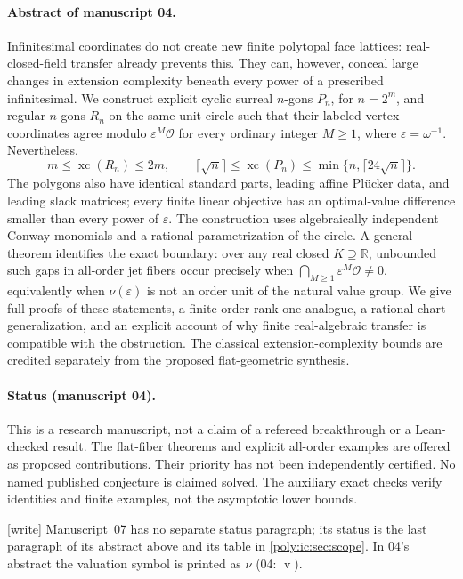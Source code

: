 \documentclass[11pt,a4paper]{article}
\numberwithin{equation}{section}
\theoremstyle{plain}
\newcommand{\wtag}{\textup{[write]}}%
\newcommand{\R}{\mathbb R}
\newcommand{\OO}{\mathcal O}
\newcommand{\xc}{\operatorname{xc}}
\renewcommand{\vv}{\operatorname{v}}%
\begin{document}
\paragraph{Abstract of manuscript 04.}
Infinitesimal coordinates do not create new finite polytopal face lattices:
real-closed-field transfer already prevents this. They can, however, conceal
large changes in extension complexity beneath every power of a prescribed
infinitesimal. We construct explicit cyclic surreal $n$-gons $P_n$, for
$n=2^m$, and regular $n$-gons $R_n$ on the same unit circle such that their
labeled vertex coordinates agree modulo $\varepsilon^M\OO$ for every ordinary
integer $M\geq1$, where $\varepsilon=\omega^{-1}$. Nevertheless,
\[
 m\leq\xc(R_n)\leq2m,
 \qquad
 \lceil\sqrt n\rceil\leq\xc(P_n)\leq\min\{n,\lceil24\sqrt n\rceil\}.
\]
The polygons also have identical standard parts, leading affine Pl\"ucker
data, and leading slack matrices; every finite linear objective has an
optimal-value difference smaller than every power of $\varepsilon$.
The construction uses algebraically independent Conway monomials and a
rational parametrization of the circle. A general theorem identifies the
exact boundary: over any real closed $K\supseteq\R$, unbounded such gaps in
all-order jet fibers occur precisely when
$\bigcap_{M\geq1}\varepsilon^M\OO\neq0$, equivalently when
$\nu(\varepsilon)$ is not an order unit of the natural value group.
We give full proofs of these statements, a finite-order rank-one analogue,
a rational-chart generalization, and an explicit account of why finite
real-algebraic transfer is compatible with the obstruction. The classical
extension-complexity bounds are credited separately from the proposed
flat-geometric synthesis.

\paragraph{Status (manuscript 04).}
This is a research manuscript, not a claim of a
refereed breakthrough or a Lean-checked result. The flat-fiber theorems and
explicit all-order examples are offered as proposed contributions. Their
priority has not been independently certified. No named published conjecture
is claimed solved. The auxiliary exact checks verify identities and finite
examples, not the asymptotic lower bounds.

\medskip\noindent
\wtag{} Manuscript~07 has no separate status paragraph; its status is the
last paragraph of its abstract above and its table in
\cref{poly:ic:sec:scope}. In 04's abstract the valuation symbol is printed
as $\nu$ (04: $\vv$).
\end{document}
